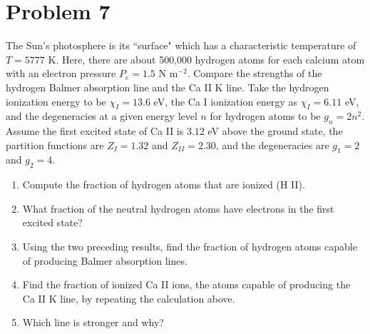 \documentclass[12pt]{article}
\begin{document}
\section*{Problem 7}
The Sun's photosphere is its ``surface" which has a characteristic temperature of $T = 5777$ K. Here, there are about 500,000 hydrogen atoms for each calcium atom with an electron pressure $P_e = 1.5$ N m$^{-2}$. Compare the strengths of the hydrogen Balmer absorption line and the Ca II K line. Take the hydrogen ionization energy to be $\chi_I = 13.6$ eV, the Ca I ionization energy as $\chi_I = 6.11$ eV, and the degeneracies at a given energy level $n$ for hydrogen atoms to be $g_n = 2n^2$. Assume the first excited state of Ca II is $3.12$ eV above the ground state, the partition functions are $Z_{I} = 1.32$ and $Z_{II} = 2.30$, and the degeneracies are $g_1 = 2$ and $g_2 = 4$.
\begin{enumerate}[label=(\alph*)]
\item Compute the fraction of hydrogen atoms that are ionized (H II).


\item What fraction of the neutral hydrogen atoms have electrons in the first excited state?




\item Using the two preceding results, find the fraction of hydrogen atoms capable of producing Balmer absorption lines.



\item Find the fraction of ionized Ca II ions, the atoms capable of producing the Ca II K line, by repeating the calculation above.


\item Which line is stronger and why?

\end{enumerate}
\end{document}
